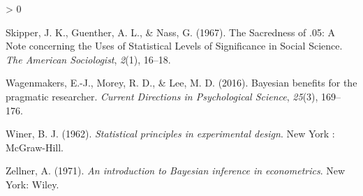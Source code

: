 \documentclass[
  english,
  ,jou,floatsintext]{apa6}
\newlength{\cslhangindent}
\newenvironment{CSLReferences}[2] %
 {%
  \setlength{\parindent}{0pt}
  \ifodd #1 \everypar{\setlength{\hangindent}{\cslhangindent}}\ignorespaces\fi
  \ifnum #2 > 0
  \setlength{\parskip}{#2\baselineskip}
  \fi
 }%
 {}
\begin{document}
\begin{CSLReferences}{1}{0}
\leavevmode\hypertarget{ref-skipper_sacredness_1967}{}%
Skipper, J. K., Guenther, A. L., \& Nass, G. (1967). The {Sacredness} of .05: {A Note} concerning the {Uses} of {Statistical Levels} of {Significance} in {Social Science}. \emph{The American Sociologist}, \emph{2}(1), 16--18.

\leavevmode\hypertarget{ref-wagenmakers2016bayesian}{}%
Wagenmakers, E.-J., Morey, R. D., \& Lee, M. D. (2016). Bayesian benefits for the pragmatic researcher. \emph{Current Directions in Psychological Science}, \emph{25}(3), 169--176.

\leavevmode\hypertarget{ref-winer_statistical_1962}{}%
Winer, B. J. (1962). \emph{Statistical principles in experimental design}. {New York : McGraw-Hill}.

\leavevmode\hypertarget{ref-zellner_introduction_1971}{}%
Zellner, A. (1971). \emph{An introduction to {Bayesian} inference in econometrics}. {New York}: {Wiley}.

\end{CSLReferences}
\end{document}
